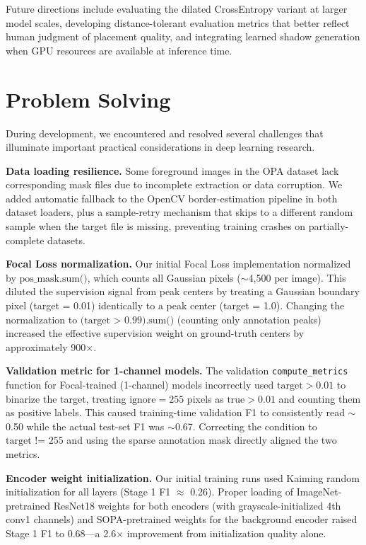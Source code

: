 \documentclass[10pt,twocolumn]{article}
\begin{document}
Future directions include evaluating the dilated CrossEntropy variant at larger model scales, developing distance-tolerant evaluation metrics that better reflect human judgment of placement quality, and integrating learned shadow generation when GPU resources are available at inference time.






\appendix

\section{Problem Solving}

During development, we encountered and resolved several challenges that illuminate important practical considerations in deep learning research.

\textbf{Data loading resilience.} Some foreground images in the OPA dataset lack corresponding mask files due to incomplete extraction or data corruption. We added automatic fallback to the OpenCV border-estimation pipeline in both dataset loaders, plus a sample-retry mechanism that skips to a different random sample when the target file is missing, preventing training crashes on partially-complete datasets.

\textbf{Focal Loss normalization.} Our initial Focal Loss implementation normalized by $\text{pos\_mask.sum()}$, which counts all Gaussian pixels ($\sim$4,500 per image). This diluted the supervision signal from peak centers by treating a Gaussian boundary pixel (target = 0.01) identically to a peak center (target = 1.0). Changing the normalization to $\text{(target > 0.99).sum()}$ (counting only annotation peaks) increased the effective supervision weight on ground-truth centers by approximately 900$\times$.

\textbf{Validation metric for 1-channel models.} The validation \texttt{compute\_metrics} function for Focal-trained (1-channel) models incorrectly used $\text{target} > 0.01$ to binarize the target, treating $\text{ignore}=255$ pixels as $\text{true} > 0.01$ and counting them as positive labels. This caused training-time validation F1 to consistently read $\sim$0.50 while the actual test-set F1 was $\sim$0.67. Correcting the condition to $\text{target != 255}$ and using the sparse annotation mask directly aligned the two metrics.

\textbf{Encoder weight initialization.} Our initial training runs used Kaiming random initialization for all layers (Stage 1 F1 $\approx$ 0.26). Proper loading of ImageNet-pretrained ResNet18 weights for both encoders (with grayscale-initialized 4th conv1 channels) and SOPA-pretrained weights for the background encoder raised Stage 1 F1 to 0.68---a 2.6$\times$ improvement from initialization quality alone.
\end{document}
